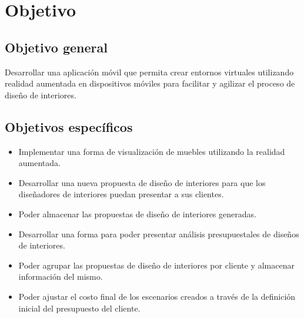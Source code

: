 \section{Objetivo}
\subsection{Objetivo general}
Desarrollar una aplicación móvil que permita crear entornos virtuales utilizando realidad aumentada en dispositivos móviles para facilitar y agilizar el proceso de diseño de interiores.

\subsection{Objetivos específicos}
\begin{itemize}
	\item Implementar una forma de visualización de muebles utilizando la realidad aumentada.
	\item Desarrollar una nueva propuesta de diseño de interiores para que los diseñadores de interiores puedan presentar a sus clientes.
	\item Poder almacenar las propuestas de diseño de interiores generadas.
	\item Desarrollar una forma para poder presentar análisis presupuestales de diseños de interiores.
	\item Poder agrupar las propuestas de diseño de interiores por cliente y almacenar información del mismo.
	\item Poder ajustar el costo final de los escenarios creados a través de la definición inicial del presupuesto del cliente.
\end{itemize}